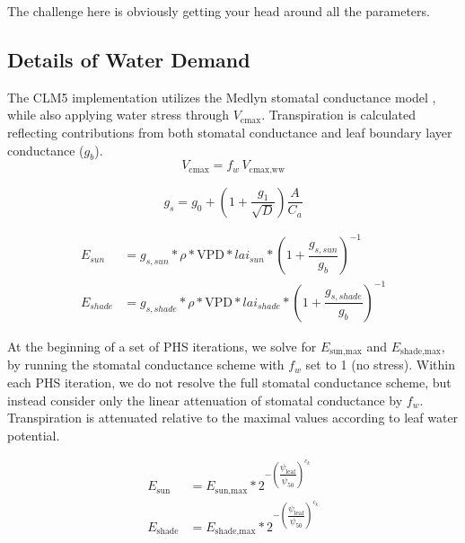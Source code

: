 \documentclass[draft,linenumbers]{agujournal}
\begin{document}
The challenge here is obviously getting your head around all the parameters.

\subsection{Details of Water Demand}

The CLM5 implementation utilizes the Medlyn stomatal conductance model \citep{medlyn2011}, while also applying water stress through $V_{\text{cmax}}$.
Transpiration is calculated reflecting contributions from both stomatal conductance and leaf boundary layer conductance ($g_b$).
    \begin{equation}
    \label{suppeq:vc}
    V_{\text{cmax}} = f_w\, V_{\text{cmax,ww}} 
    \end{equation}
    
    \begin{equation}
    \label{suppeq:gs}
    g_s=g_0+\left(1+\dfrac{g_1}{\sqrt{D}}\right)\dfrac{A}{C_a}
    \end{equation}
    
    \begin{equation}
    \begin{aligned}
    \label{suppeq:e1}
    E_{sun} &=   g_{s,sun}*\rho*\text{VPD}*lai_{sun}*\left(1+\dfrac{g_{s,sun}}{g_b}\right)^{-1} \\
    E_{shade} &=   g_{s,shade}*\rho*\text{VPD}*lai_{shade}*\left(1+\dfrac{g_{s,shade}}{g_b}\right)^{-1}
    \end{aligned}
    \end{equation}

At the beginning of a set of PHS iterations, we solve for $E_{\text{sun,max}}$ and $E_{\text{shade,max}}$, 
by running the stomatal conductance scheme with $f_w$ set to 1 (no stress).
Within each PHS iteration, we do not resolve the full stomatal conductance scheme, 
but instead consider only the linear attenuation of stomatal conductance by $f_w$.
Transpiration is attenuated relative to the maximal values according to leaf water potential.

    \begin{equation}
    \begin{aligned}
    \label{suppeq:e2}
    E_{\text{sun}} &=   E_{\text{sun,max}}*2^{-\left(\dfrac{\psi_{\text{leaf}}}{\psi_{50}}\right)^{c_k}} \\
    E_{\text{shade}} &=   E_{\text{shade,max}}*2^{-\left(\dfrac{\psi_{\text{leaf}}}{\psi_{50}}\right)^{c_k}}
    \end{aligned}
    \end{equation}
    
\end{document}
